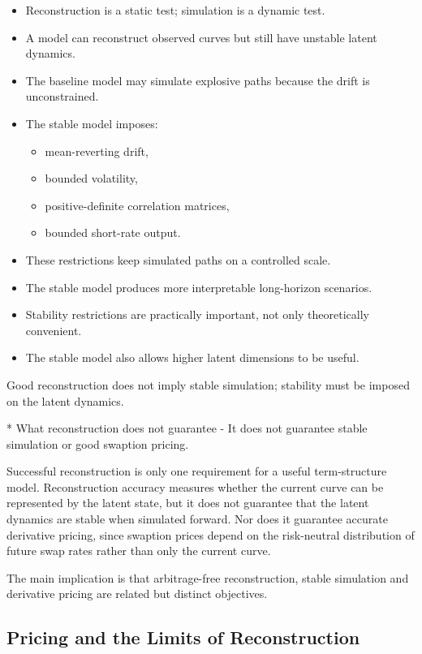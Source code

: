 \begin{itemize}
    \item Reconstruction is a static test; simulation is a dynamic test.
    \item A model can reconstruct observed curves but still have unstable latent dynamics.
    \item The baseline model may simulate explosive paths because the drift is unconstrained.
    \item The stable model imposes:
    \begin{itemize}
        \item mean-reverting drift,
        \item bounded volatility,
        \item positive-definite correlation matrices,
        \item bounded short-rate output.
    \end{itemize}
    \item These restrictions keep simulated paths on a controlled scale.
    \item The stable model produces more interpretable long-horizon scenarios.
    \item Stability restrictions are practically important, not only theoretically convenient.
    \item The stable model also allows higher latent dimensions to be useful.
\end{itemize}

Good reconstruction does not imply stable simulation; stability must be imposed on the latent dynamics.

* What reconstruction does not guarantee
- It does not guarantee stable simulation or good swaption pricing.

Successful reconstruction is only one requirement for a useful term-structure model. Reconstruction accuracy measures whether the current curve can be represented by the latent state, but it does not guarantee that the latent dynamics are stable when simulated forward. Nor does it guarantee accurate derivative pricing, since swaption prices depend on the risk-neutral distribution of future swap rates rather than only the current curve.

The main implication is that arbitrage-free reconstruction, stable simulation and derivative pricing are related but distinct objectives.

\subsection{Pricing and the Limits of Reconstruction}

